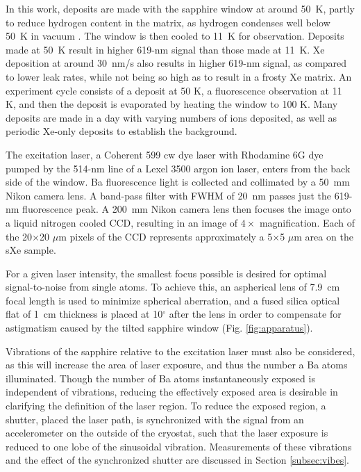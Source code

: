 \documentclass[aps,pra,reprint,superscriptaddress]{revtex4-1}
\begin{document}
In this work, deposits are made with the sapphire window at around 50~K, partly to reduce hydrogen content in the matrix, as hydrogen condenses well below 50~K in vacuum \cite{Mong2015}.  The window is then cooled to 11~K for observation.  Deposits made at 50~K result in higher 619-nm signal than those made at 11~K.  Xe deposition at around 30~nm/s also results in higher 619-nm signal, as compared to lower leak rates, while not being so high as to result in a frosty Xe matrix.  An experiment cycle consists of a deposit at 50 K, a fluorescence observation at 11 K, and then the deposit is evaporated by heating the window to 100 K.  Many deposits are made in a day with varying numbers of ions deposited, as well as periodic Xe-only deposits to establish the background.

The excitation laser, a Coherent 599 cw dye laser with Rhodamine 6G dye pumped by the 514-nm line of a Lexel 3500 argon ion laser, enters from the back side of the window.  Ba fluorescence light is collected and collimated by a 50~mm Nikon camera lens.  A band-pass filter with FWHM of 20~nm passes just the 619-nm fluorescence peak.  A 200~mm Nikon camera lens then focuses the image onto a liquid nitrogen cooled CCD, resulting in an image of $4 \times$ magnification.  Each of the 20$\times$20 $\mu$m pixels of the CCD represents approximately a 5$\times$5 $\mu$m area on the sXe sample.

For a given laser intensity, the smallest focus possible is desired for optimal signal-to-noise from single atoms.  To achieve this, an aspherical lens of 7.9~cm focal length \cite{asphere} is used to minimize spherical aberration, and a fused silica optical flat of 1~cm thickness is placed at 10$^{\circ}$ after the lens in order to compensate for astigmatism caused by the tilted sapphire window (Fig. \ref{fig:apparatus}).

Vibrations of the sapphire relative to the excitation laser must also be considered, as this will increase the area of laser exposure, and thus the number a Ba atoms illuminated.  Though the number of Ba atoms instantaneously exposed is independent of vibrations, reducing the effectively exposed area is desirable in clarifying the definition of the laser region.  To reduce the exposed region, a shutter, placed the laser path, is synchronized with the signal from an accelerometer on the outside of the cryostat, such that the laser exposure is reduced to one lobe of the sinusoidal vibration.  Measurements of these vibrations and the effect of the synchronized shutter are discussed in Section \ref{subsec:vibes}.
\end{document}
